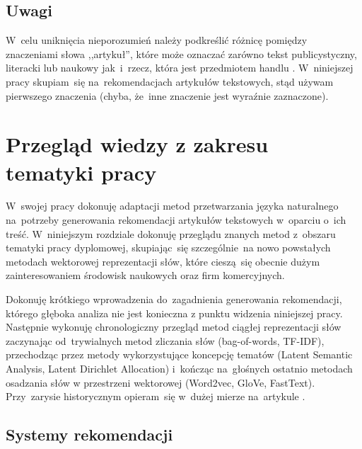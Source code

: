 \documentclass[pl]{minipw} %
\begin{document}
\section{Uwagi}
W~celu uniknięcia nieporozumień należy podkreślić różnicę pomiędzy znaczeniami słowa ,,artykuł'', które może oznaczać zarówno tekst publicystyczny, literacki lub naukowy jak~i~rzecz, która jest przedmiotem handlu \cite{slownik}. W~niniejszej pracy skupiam~się na~rekomendacjach artykułów tekstowych, stąd używam pierwszego znaczenia (chyba, że~inne znaczenie jest wyraźnie zaznaczone).

\chapter{Przegląd wiedzy z zakresu tematyki pracy}
W~swojej pracy dokonuję adaptacji metod przetwarzania języka naturalnego na~potrzeby generowania rekomendacji artykułów tekstowych w~oparciu o~ich treść. W~niniejszym rozdziale dokonuję przeglądu znanych metod z~obszaru tematyki pracy dyplomowej, skupiając~się szczególnie~na nowo powstałych metodach wektorowej reprezentacji słów, które cieszą~się obecnie dużym zainteresowaniem środowisk naukowych oraz firm komercyjnych. 

Dokonuję krótkiego wprowadzenia do~zagadnienia generowania rekomendacji, którego głęboka analiza nie jest konieczna z punktu widzenia niniejszej pracy. Następnie wykonuję chronologiczny przegląd metod ciągłej reprezentacji słów zaczynając od~trywialnych metod zliczania słów (bag-of-words, TF-IDF), przechodząc przez metody wykorzystujące koncepcję tematów (Latent Semantic Analysis, Latent Dirichlet Allocation) i~kończąc na~głośnych ostatnio metodach osadzania słów w przestrzeni wektorowej (Word2vec, GloVe, FastText). Przy~zarysie historycznym opieram~się w~dużej mierze na~artykule \cite{aylien}.


\section{Systemy rekomendacji}
\end{document}
